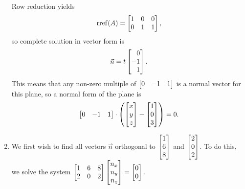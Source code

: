 \begin{exercises}
\begin{problist}
\begin{solution}
\begin{enumerate}
\[					\]
					Row reduction yields
					\[
						\Rref(A) = \mat{1&0&0\\0&1&1},
					\]
					so complete solution in vector form is 
					\[
						\vec n = t\mat{0\\-1\\1}.
					\]
					This means that any non-zero multiple of $\mat{0&-1&1}$ is a normal vector for this plane, so a normal form of the plane is 
					\[
						\mat{0&-1&1} \cdot \left(\mat{x\\y\\z} - \mat{1\\0\\3}\right)=0.
					\]
				\item  We first wish to find all vectors $\vec n$ orthogonal to $\mat{1\\6\\8}$ and $\mat{2\\0\\2}$. 
					To do this, we solve the system 
					$\mat{1&6&8\\2&0&2}\mat{n_x\\n_y\\n_z}=\mat{0\\0}.$


\end{enumerate}
\end{solution}
\end{problist}
\end{exercises}

